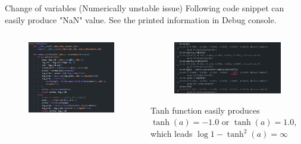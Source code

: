 \documentclass[8pt]{beamer}
\begin{document}
\begin{frame}{Change of variables (Numerically unstable issue)}
    Following code snippet can easily produce "NaN" value. See the printed information in Debug console.
    \begin{columns}
        \begin{column}{0.5\textwidth}
            \begin{figure}
                \includegraphics[width=1.0\textwidth]{UnstableCoV.png}
            \end{figure}
        \end{column}
        \begin{column}{0.5\textwidth}
            \begin{figure}
                \includegraphics[width=1.0\textwidth]{LogProbInf.png}
            \end{figure}
            Tanh function easily produces $\operatorname{tanh}(a) = -1.0$ or $\operatorname{tanh}(a) = 1.0$, which leads $\log{1 - \operatorname{tanh}^2 (a)} = \infty$

\end{column}
\end{columns}
\end{frame}
\end{document}
